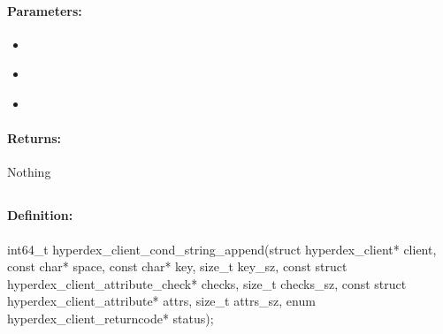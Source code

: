 \paragraph{Parameters:}
\begin{itemize}[noitemsep]
\item {}\\

\item {}\\

\item {}\\

\end{itemize}

\paragraph{Returns:}
Nothing
\pagebreak
\subsection{}
\label{api:c:cond_string_append}


\paragraph{Definition:}
\begin{ccode}
int64_t hyperdex_client_cond_string_append(struct hyperdex_client* client,
        const char* space,
        const char* key, size_t key_sz,
        const struct hyperdex_client_attribute_check* checks, size_t checks_sz,
        const struct hyperdex_client_attribute* attrs, size_t attrs_sz,
        enum hyperdex_client_returncode* status);
\end{ccode}

